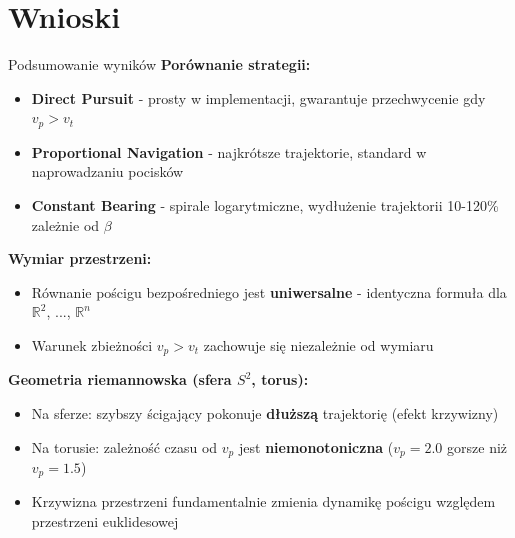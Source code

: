 \documentclass[aspectratio=169,11pt]{beamer}
\begin{document}
\section{Wnioski}

\begin{frame}{Podsumowanie wyników}
\small
\setlength{\itemsep}{2pt}
\textbf{Porównanie strategii:}
\begin{itemize}\setlength{\itemsep}{1pt}
    \item \textbf{Direct Pursuit} - prosty w implementacji, gwarantuje przechwycenie gdy $v_p > v_t$
    \item \textbf{Proportional Navigation} - najkrótsze trajektorie, standard w naprowadzaniu pocisków
    \item \textbf{Constant Bearing} - spirale logarytmiczne, wydłużenie trajektorii 10-120\% zależnie od $\beta$
\end{itemize}

\vspace{-0.1cm}
\textbf{Wymiar przestrzeni:}
\begin{itemize}\setlength{\itemsep}{1pt}
    \item Równanie pościgu bezpośredniego jest \textbf{uniwersalne} - identyczna formuła dla $\mathbb{R}^2$, ..., $\mathbb{R}^n$
    \item Warunek zbieżności $v_p > v_t$ zachowuje się niezależnie od wymiaru
\end{itemize}

\vspace{-0.1cm}
\textbf{Geometria riemannowska (sfera $S^2$, torus):}
\begin{itemize}\setlength{\itemsep}{1pt}
    \item Na sferze: szybszy ścigający pokonuje \textbf{dłuższą} trajektorię (efekt krzywizny)
    \item Na torusie: zależność czasu od $v_p$ jest \textbf{niemonotoniczna} ($v_p = 2.0$ gorsze niż $v_p = 1.5$)
    \item Krzywizna przestrzeni fundamentalnie zmienia dynamikę pościgu względem przestrzeni euklidesowej
\end{itemize}
\end{frame}
\end{document}
